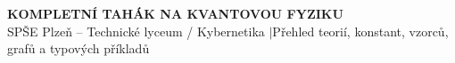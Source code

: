 \documentclass[9pt,a4paper]{article}
\begin{document}
\begin{tcolorbox}[colback=primary,colframe=primary,arc=1mm,left=2mm,right=2mm,top=1mm,bottom=1mm]
\color{white}
\begin{center}
{\bfseries\large KOMPLETNÍ TAHÁK NA KVANTOVOU FYZIKU}\\[0.5mm]
{\footnotesize SPŠE Plzeň -- Technické lyceum / Kybernetika \quad$\vert$\quad Přehled teorií, konstant, vzorců, grafů a typových příkladů}
\end{center}
\end{tcolorbox}

\end{document}
